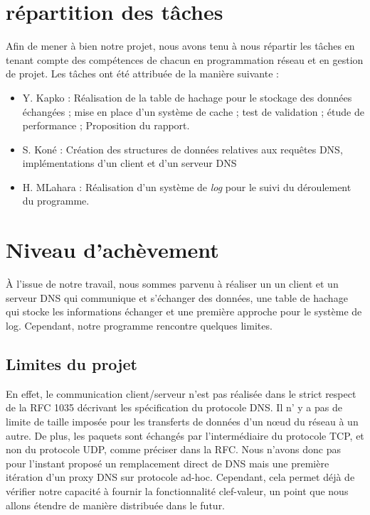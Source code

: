 \documentclass[12pt,a4paper]{article}
\begin{document}
\section{répartition des tâches}
\quad Afin de mener à bien notre projet, nous avons tenu à nous répartir les tâches en tenant compte des compétences de chacun en programmation réseau et en gestion de projet. Les tâches ont été attribuée de la manière suivante :
\begin{itemize}
    \item Y. Kapko : Réalisation de la table de hachage pour le stockage des données échangées ; mise en place d’un système de cache ; test de validation ; étude de performance ; Proposition du rapport.
    \item S. Koné : Création des structures de données relatives aux requêtes DNS, implémentations d’un client et d’un serveur DNS
    \item H. MLahara : Réalisation d’un système de \textit{log} pour le suivi du déroulement du programme.
\end{itemize}

\newpage
\section{Niveau d’achèvement}

\quad À l’issue de notre travail, nous sommes parvenu à réaliser un un client et un serveur DNS qui communique et s’échanger des données, une table de hachage qui stocke les informations échanger et une première approche pour le système de log. Cependant, notre programme rencontre quelques limites.

\subsection{Limites du projet}

\quad En effet, le communication client/serveur n’est pas réalisée dans le strict respect de la RFC 1035 décrivant les spécification du protocole DNS. Il n’ y a pas de limite de taille imposée pour les transferts de données d’un nœud du réseau à un autre. De plus, les paquets sont échangés par l’intermédiaire du protocole TCP, et non du protocole UDP, comme préciser dans la RFC. Nous n'avons donc pas pour l'instant proposé un remplacement direct de DNS mais une première itération d'un proxy DNS sur protocole ad-hoc. Cependant, cela permet déjà de vérifier notre capacité à fournir la fonctionnalité clef-valeur, un point que nous allons étendre de manière distribuée dans le futur.
\end{document}
